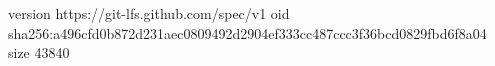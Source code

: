 version https://git-lfs.github.com/spec/v1
oid sha256:a496cfd0b872d231aec0809492d2904ef333cc487ccc3f36bcd0829fbd6f8a04
size 43840

